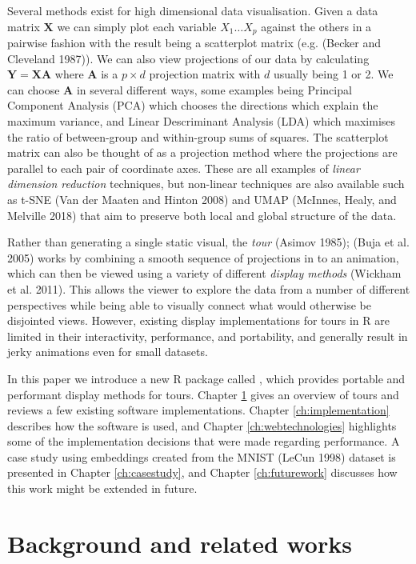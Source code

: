 Several methods exist for high dimensional data visualisation. Given a data matrix \(\mathbf X\) we can simply plot each variable \(X_1 \dots X_p\) against the others in a pairwise fashion with the result being a scatterplot matrix (e.g. (Becker and Cleveland 1987)). We can also view projections of our data by calculating \(\mathbf Y = \mathbf X \mathbf A\) where \(\mathbf A\) is a \(p \times d\) projection matrix with \(d\) usually being 1 or 2. We can choose \(\mathbf A\) in several different ways, some examples being Principal Component Analysis (PCA) which chooses the directions which explain the maximum variance, and Linear Descriminant Analysis (LDA) which maximises the ratio of between-group and within-group sums of squares. The scatterplot matrix can also be thought of as a projection method where the projections are parallel to each pair of coordinate axes. These are all examples of \emph{linear dimension reduction} techniques, but non-linear techniques are also available such as t-SNE (Van der Maaten and Hinton 2008) and UMAP (McInnes, Healy, and Melville 2018) that aim to preserve both local and global structure of the data.

Rather than generating a single static visual, the \emph{tour} (Asimov 1985); (Buja et al. 2005) works by combining a smooth sequence of projections in to an animation, which can then be viewed using a variety of different \emph{display methods} (Wickham et al. 2011). This allows the viewer to explore the data from a number of different perspectives while being able to visually connect what would otherwise be disjointed views. However, existing display implementations for tours in R are limited in their interactivity, performance, and portability, and generally result in jerky animations even for small datasets.

In this paper we introduce a new R package called , which provides portable and performant display methods for tours. Chapter \ref{ch:litreview} gives an overview of tours and reviews a few existing software implementations. Chapter \ref{ch:implementation} describes how the software is used, and Chapter \ref{ch:webtechnologies} highlights some of the implementation decisions that were made regarding performance. A case study using embeddings created from the MNIST (LeCun 1998) dataset is presented in Chapter \ref{ch:casestudy}, and Chapter \ref{ch:futurework} discusses how this work might be extended in future.

\pagebreak

\hypertarget{ch:litreview}{%
\section{Background and related works}\label{ch:litreview}}

